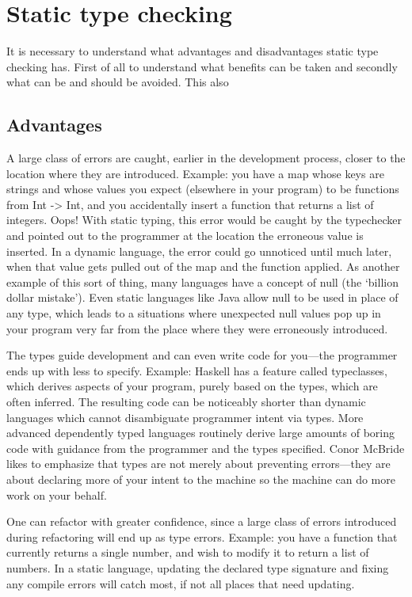 \section{Static type checking}
It is necessary to understand what advantages and disadvantages static type
checking has. First of all to understand what benefits can be taken and secondly
what can be and should be avoided. This also


\subsection{Advantages}
A large class of errors are caught, earlier in the development process, closer
to the location where they are introduced. Example: you have a map whose keys
are strings and whose values you expect (elsewhere in your program) to be
functions from Int -> Int, and you accidentally insert a function that returns a
list of integers. Oops! With static typing, this error would be caught by the
typechecker and pointed out to the programmer at the location the erroneous
value is inserted. In a dynamic language, the error could go unnoticed until
much later, when that value gets pulled out of the map and the function applied.
As another example of this sort of thing, many languages have a concept of null
(the ‘billion dollar mistake’). Even static languages like Java allow null to be
used in place of any type, which leads to a situations where unexpected null
values pop up in your program very far from the place where they were
erroneously introduced.

The types guide development and can even write code for you—the programmer ends
up with less to specify. Example: Haskell has a feature called typeclasses,
which derives aspects of your program, purely based on the types, which are
often inferred. The resulting code can be noticeably shorter than dynamic
languages which cannot disambiguate programmer intent via types. More advanced
dependently typed languages routinely derive large amounts of boring code with
guidance from the programmer and the types specified. Conor McBride likes to
emphasize that types are not merely about preventing errors—they are about
declaring more of your intent to the machine so the machine can do more work on
your behalf.

One can refactor with greater confidence, since a large class of errors
introduced during refactoring will end up as type errors. Example: you have a
function that currently returns a single number, and wish to modify it to return
a list of numbers. In a static language, updating the declared type signature
and fixing any compile errors will catch most, if not all places that need
updating.

